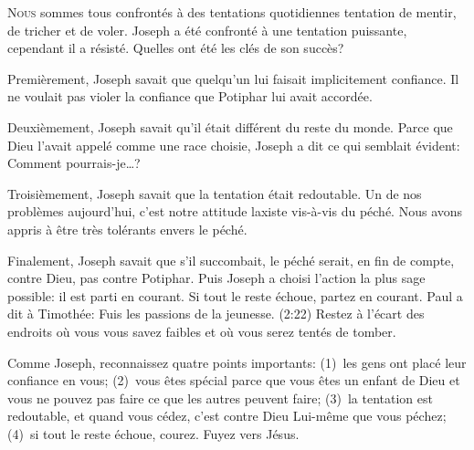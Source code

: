 



\lettrine{N}{ous} sommes tous confrontés à des tentations quotidiennes
 \ocadr{}tentation de mentir, de tricher et de voler.
 Joseph a été confronté à une tentation puissante,
 cependant il a résisté.
 Quelles ont été les clés de son succès? 

Premièrement, Joseph savait que quelqu'un lui faisait implicitement confiance.
 Il ne voulait pas violer la confiance que Potiphar lui avait accordée. 

Deuxièmement, Joseph savait qu'il était différent du reste du monde.
 Parce que Dieu l'avait appelé comme une race choisie,
 Joseph a dit ce qui semblait évident: \Og Comment pourrais-je\dots{}?\Fg{}

Troisièmement, Joseph savait que la tentation était redoutable.
 Un de nos problèmes aujourd'hui, c'est notre attitude laxiste
 vis-à-vis du péché.
 Nous avons appris à être très tolérants envers le péché. 

Finalement, Joseph savait que s'il succombait, le péché serait,
 en fin de compte, contre Dieu, pas contre Potiphar.
 Puis Joseph a choisi l'action la plus sage possible:
 il est parti en courant.
 Si tout le reste échoue, partez en courant.
 Paul a dit à Timothée:
 \Og Fuis les passions de la jeunesse. \Fg{}
 (2:22)
 Restez à l'écart des endroits où vous vous savez faibles
 et où vous serez tentés de tomber. 


Comme Joseph, reconnaissez quatre points importants:
 (1)~les gens ont placé leur confiance en vous;
 (2)~vous êtes spécial parce que vous êtes un enfant de Dieu
  et vous ne pouvez pas faire ce que les autres peuvent faire;
 (3)~la tentation est redoutable, et quand vous cédez,
  c'est contre Dieu Lui-même que vous péchez;
 (4)~si tout le reste échoue, courez. Fuyez vers Jésus.

